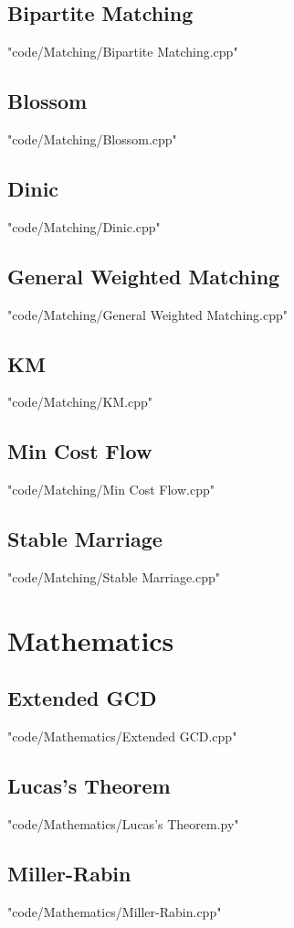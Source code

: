 \documentclass [landscape,8pt,a4paper,twocolumn]{article}
\begin{document}
\subsection{Bipartite Matching}
 {"code/Matching/Bipartite Matching.cpp"}
\subsection{Blossom}
 {"code/Matching/Blossom.cpp"}
\subsection{Dinic}
 {"code/Matching/Dinic.cpp"}
\subsection{General Weighted Matching}
 {"code/Matching/General Weighted Matching.cpp"}
\subsection{KM}
 {"code/Matching/KM.cpp"}
\subsection{Min Cost Flow}
 {"code/Matching/Min Cost Flow.cpp"}
\subsection{Stable Marriage}
 {"code/Matching/Stable Marriage.cpp"}
\section{Mathematics}
\subsection{Extended GCD}
 {"code/Mathematics/Extended GCD.cpp"}
\subsection{Lucas's Theorem}
 {"code/Mathematics/Lucas's Theorem.py"}
\subsection{Miller-Rabin}
 {"code/Mathematics/Miller-Rabin.cpp"}
\end{document}
